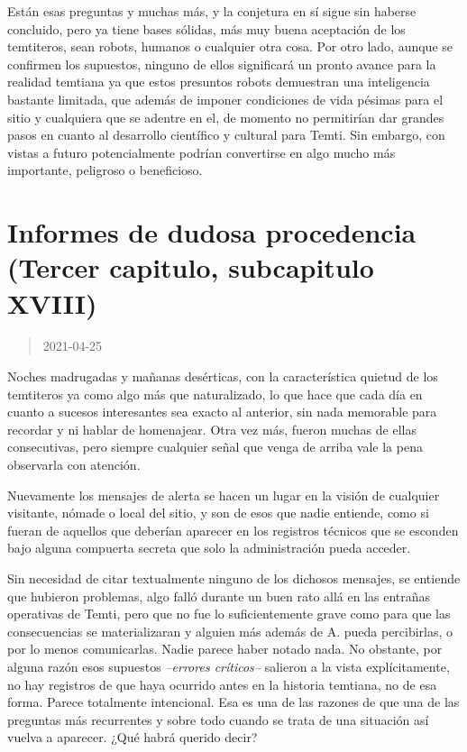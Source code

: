 \documentclass[
  spanish,
]{book}
\begin{document}
Están esas preguntas y muchas más, y la conjetura en sí sigue sin haberse concluido, pero ya tiene bases sólidas, más muy buena aceptación de los temtiteros, sean robots, humanos o cualquier otra cosa. Por otro lado, aunque se confirmen los supuestos, ninguno de ellos significará un pronto avance para la realidad temtiana ya que estos presuntos robots demuestran una inteligencia bastante limitada, que además de imponer condiciones de vida pésimas para el sitio y cualquiera que se adentre en el, de momento no permitirían dar grandes pasos en cuanto al desarrollo científico y cultural para Temti. Sin embargo, con vistas a futuro potencialmente podrían convertirse en algo mucho más importante, peligroso o beneficioso.

\hypertarget{informes-de-dudosa-procedencia-tercer-capitulo-subcapitulo-xviii}{%
\section{Informes de dudosa procedencia (Tercer capitulo, subcapitulo XVIII)}\label{informes-de-dudosa-procedencia-tercer-capitulo-subcapitulo-xviii}}

\begin{quote}
2021-04-25
\end{quote}

Noches madrugadas y mañanas desérticas, con la característica quietud de los temtiteros ya como algo más que naturalizado, lo que hace que cada día en cuanto a sucesos interesantes sea exacto al anterior, sin nada memorable para recordar y ni hablar de homenajear. Otra vez más, fueron muchas de ellas consecutivas, pero siempre cualquier señal que venga de arriba vale la pena observarla con atención.

Nuevamente los mensajes de alerta se hacen un lugar en la visión de cualquier visitante, nómade o local del sitio, y son de esos que nadie entiende, como si fueran de aquellos que deberían aparecer en los registros técnicos que se esconden bajo alguna compuerta secreta que solo la administración pueda acceder.

Sin necesidad de citar textualmente ninguno de los dichosos mensajes, se entiende que hubieron problemas, algo falló durante un buen rato allá en las entrañas operativas de Temti, pero que no fue lo suficientemente grave como para que las consecuencias se materializaran y alguien más además de A. pueda percibirlas, o por lo menos comunicarlas. Nadie parece haber notado nada.
No obstante, por alguna razón esos supuestos \emph{--errores críticos--} salieron a la vista explícitamente, no hay registros de que haya ocurrido antes en la historia temtiana, no de esa forma. Parece totalmente intencional. Esa es una de las razones de que una de las preguntas más recurrentes y sobre todo cuando se trata de una situación así vuelva a aparecer. ¿Qué habrá querido decir?
\end{document}
